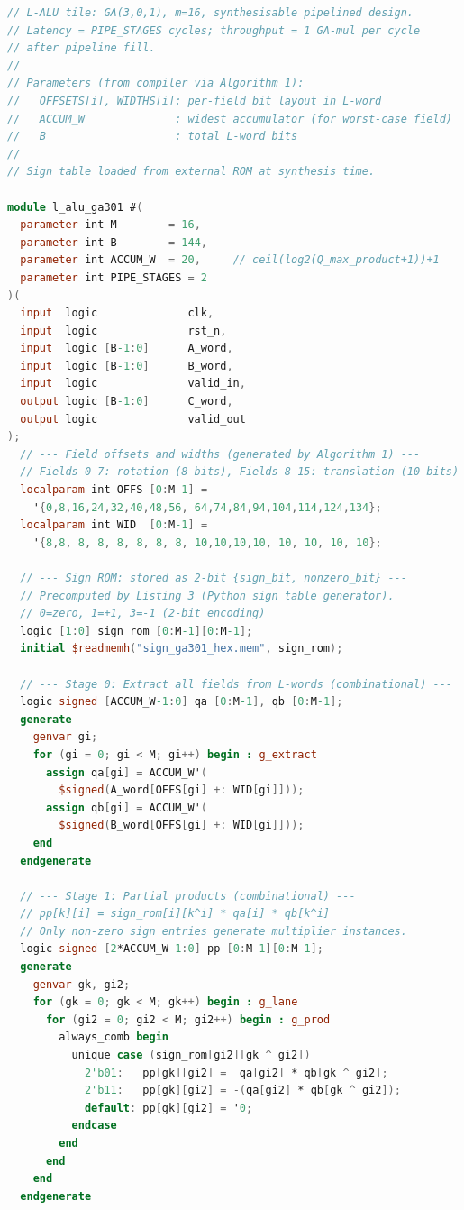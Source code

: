 \documentclass[11pt,a4paper]{article}
\theoremstyle{definition}
\theoremstyle{plain}
\theoremstyle{remark}
\newcommand{\GA}{\mathbb{G}}
\begin{document}
\begin{lstlisting}[language=Verilog,
  caption={L-ALU tile for $\GA(3,0,1)$, $m=16$, pipelined (synthesisable)},
  label=lst:verilog-v2]
// L-ALU tile: GA(3,0,1), m=16, synthesisable pipelined design.
// Latency = PIPE_STAGES cycles; throughput = 1 GA-mul per cycle
// after pipeline fill.
//
// Parameters (from compiler via Algorithm 1):
//   OFFSETS[i], WIDTHS[i]: per-field bit layout in L-word
//   ACCUM_W              : widest accumulator (for worst-case field)
//   B                    : total L-word bits
//
// Sign table loaded from external ROM at synthesis time.

module l_alu_ga301 #(
  parameter int M        = 16,
  parameter int B        = 144,
  parameter int ACCUM_W  = 20,     // ceil(log2(Q_max_product+1))+1
  parameter int PIPE_STAGES = 2
)(
  input  logic              clk,
  input  logic              rst_n,
  input  logic [B-1:0]      A_word,
  input  logic [B-1:0]      B_word,
  input  logic              valid_in,
  output logic [B-1:0]      C_word,
  output logic              valid_out
);
  // --- Field offsets and widths (generated by Algorithm 1) ---
  // Fields 0-7: rotation (8 bits), Fields 8-15: translation (10 bits)
  localparam int OFFS [0:M-1] =
    '{0,8,16,24,32,40,48,56, 64,74,84,94,104,114,124,134};
  localparam int WID  [0:M-1] =
    '{8,8, 8, 8, 8, 8, 8, 8, 10,10,10,10, 10, 10, 10, 10};

  // --- Sign ROM: stored as 2-bit {sign_bit, nonzero_bit} ---
  // Precomputed by Listing 3 (Python sign table generator).
  // 0=zero, 1=+1, 3=-1 (2-bit encoding)
  logic [1:0] sign_rom [0:M-1][0:M-1];
  initial $readmemh("sign_ga301_hex.mem", sign_rom);

  // --- Stage 0: Extract all fields from L-words (combinational) ---
  logic signed [ACCUM_W-1:0] qa [0:M-1], qb [0:M-1];
  generate
    genvar gi;
    for (gi = 0; gi < M; gi++) begin : g_extract
      assign qa[gi] = ACCUM_W'(
        $signed(A_word[OFFS[gi] +: WID[gi]]));
      assign qb[gi] = ACCUM_W'(
        $signed(B_word[OFFS[gi] +: WID[gi]]));
    end
  endgenerate

  // --- Stage 1: Partial products (combinational) ---
  // pp[k][i] = sign_rom[i][k^i] * qa[i] * qb[k^i]
  // Only non-zero sign entries generate multiplier instances.
  logic signed [2*ACCUM_W-1:0] pp [0:M-1][0:M-1];
  generate
    genvar gk, gi2;
    for (gk = 0; gk < M; gk++) begin : g_lane
      for (gi2 = 0; gi2 < M; gi2++) begin : g_prod
        always_comb begin
          unique case (sign_rom[gi2][gk ^ gi2])
            2'b01:   pp[gk][gi2] =  qa[gi2] * qb[gk ^ gi2];
            2'b11:   pp[gk][gi2] = -(qa[gi2] * qb[gk ^ gi2]);
            default: pp[gk][gi2] = '0;
          endcase
        end
      end
    end
  endgenerate


\end{lstlisting}
\end{document}
